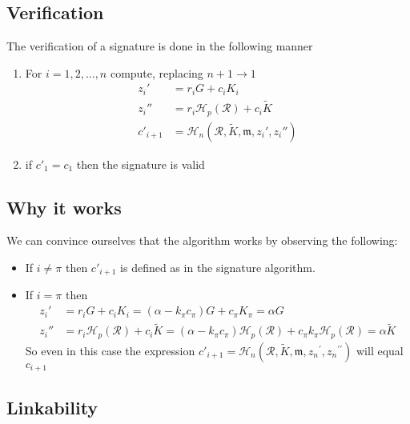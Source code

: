 \subsection*{Verification}

The verification of a signature is done in the following manner

\begin{enumerate}
	\item  For \(i = 1, 2, ..., n\) compute, replacing \(n + 1 \rightarrow 1\)
	\begin{align*}
	z_i'       &= r_i G + c_i {K_i} \\
	z_i''      & = r_i \mathcal{H}_p(\mathcal{R}) + c_i \tilde{K} \\
	c'_{i+1}   &= \mathcal{H}_n(\mathcal{R}, \tilde{K}, \mathfrak{m}, {z_i}', {z_i}'')
	\end{align*}
	
	\item if \(c'_1 = c_1\) then the signature is valid
\end{enumerate}



\subsection*{Why it works}

We can convince ourselves that the algorithm works by observing the following:

\begin{itemize}
	
	\item[]If \(i \ne \pi\) then \(c'_{i+1}\) is defined as in the signature algorithm.

	\item[] If \(i = \pi\) then 
	\begin{align*}
	   z_i'  &= r_i G + c_i K_i = (\alpha - k_\pi c_\pi) G + c_\pi K_\pi = \alpha G \\
	   z_i'' &= r_i \mathcal{H}_p(\mathcal{R}) + c_i \tilde{K} = (\alpha - k_\pi c_\pi) \mathcal{H}_p(\mathcal{R}) + c_\pi k_\pi \mathcal{H}_p(\mathcal{R}) =  \alpha \tilde{K}
    \end{align*}
    So even in this case the expression \(c'_{i+1} = \mathcal{H}_n(\mathcal{R}, \tilde{K}, \mathfrak{m}, {z_n}^\prime, {z_n}^{\prime\prime})\) will equal \(c_{i+1}\)
\end{itemize}


\subsection*{Linkability}

